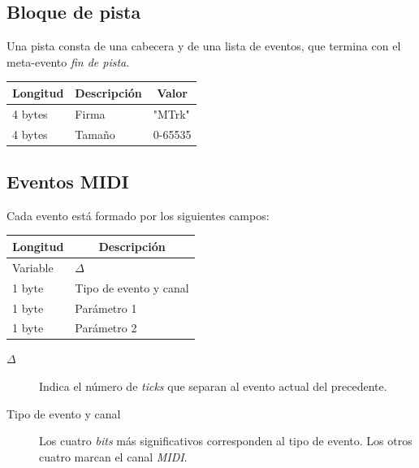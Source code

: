 \subsection{Bloque de pista}

Una pista consta de una cabecera y de una lista de eventos, que termina con el meta-evento \textit{fin de pista}.

\smallskip

\begin{center}
	\begin{tabular}{|l|l|l|}
		\hline \multicolumn{1}{|c|}{\textbf{Longitud}} & \multicolumn{1}{c|}{\textbf{Descripción}} & \multicolumn{1}{c|}{\textbf{Valor}} \\
		\hline 4 bytes & Firma & "MTrk" \\ 
		\hline 4 bytes & Tamaño & 0-65535 \\  
		\hline 
	\end{tabular}
	\smallskip
\end{center}

\smallskip

\subsection{Eventos MIDI}

Cada evento está formado por los siguientes campos:

\smallskip

\begin{center}
	\begin{tabular}{|l|l|}
		\hline \multicolumn{1}{|c|}{\textbf{Longitud}} & \multicolumn{1}{c|}{\textbf{Descripción}} \\
		\hline Variable & $\Delta$ \\ 
		\hline 1 byte & Tipo de evento y canal \\ 
		\hline 1 byte & Parámetro 1 \\ 
		\hline 1 byte & Parámetro 2 \\ 
		\hline 
	\end{tabular}
	\smallskip
\end{center}

\smallskip

\begin{description}
	\item[$\Delta$] Indica el número de \textit{ticks} que separan al evento actual del precedente.
	\item[Tipo de evento y canal] Los cuatro \textit{bits} más significativos corresponden al tipo de evento. Los otros cuatro marcan el canal \textit{MIDI}.
\end{description}

